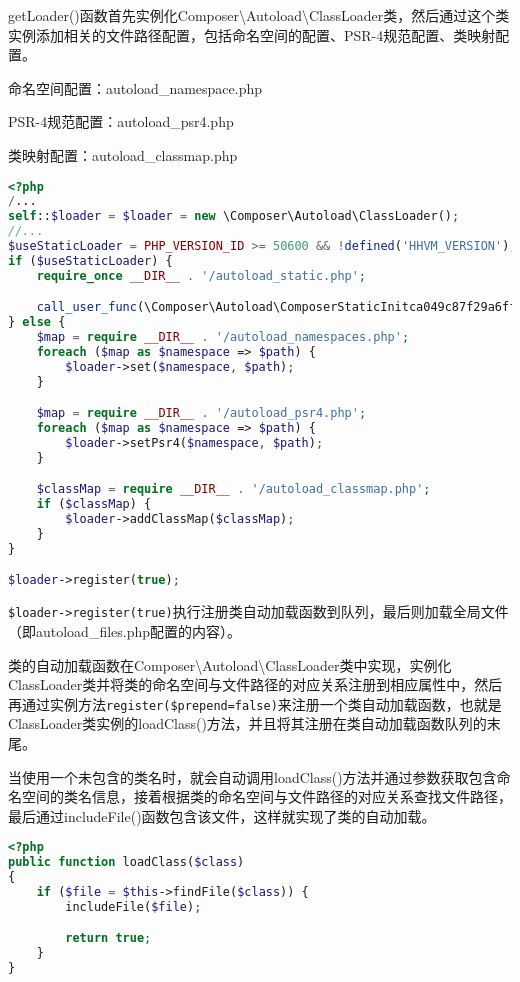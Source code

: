 getLoader()函数首先实例化Composer\textbackslash Autoload\textbackslash ClassLoader类，然后通过这个类实例添加相关的文件路径配置，包括命名空间的配置、PSR-4规范配置、类映射配置。

\begin{compactitem}
\item 命名空间配置：autoload\_namespace.php
\item PSR-4规范配置：autoload\_psr4.php
\item 类映射配置：autoload\_classmap.php
\end{compactitem}


\begin{lstlisting}[language=PHP]
<?php
/...
self::$loader = $loader = new \Composer\Autoload\ClassLoader();
//...
$useStaticLoader = PHP_VERSION_ID >= 50600 && !defined('HHVM_VERSION');
if ($useStaticLoader) {
    require_once __DIR__ . '/autoload_static.php';

    call_user_func(\Composer\Autoload\ComposerStaticInitca049c87f29a6ff5956132f96c58718a::getInitializer($loader));
} else {
    $map = require __DIR__ . '/autoload_namespaces.php';
    foreach ($map as $namespace => $path) {
        $loader->set($namespace, $path);
    }

    $map = require __DIR__ . '/autoload_psr4.php';
    foreach ($map as $namespace => $path) {
        $loader->setPsr4($namespace, $path);
    }

    $classMap = require __DIR__ . '/autoload_classmap.php';
    if ($classMap) {
        $loader->addClassMap($classMap);
    }
}

$loader->register(true);
\end{lstlisting}

\texttt{\$loader->register(true)}执行注册类自动加载函数到队列，最后则加载全局文件（即autoload\_files.php配置的内容）。

类的自动加载函数在Composer\textbackslash Autoload\textbackslash ClassLoader类中实现，实例化ClassLoader类并将类的命名空间与文件路径的对应关系注册到相应属性中，然后再通过实例方法\texttt{register(\$prepend=false)}来注册一个类自动加载函数，也就是ClassLoader类实例的loadClass()方法，并且将其注册在类自动加载函数队列的末尾。

当使用一个未包含的类名时，就会自动调用loadClass()方法并通过参数获取包含命名空间的类名信息，接着根据类的命名空间与文件路径的对应关系查找文件路径，最后通过includeFile()函数包含该文件，这样就实现了类的自动加载。

\begin{lstlisting}[language=PHP]
<?php
public function loadClass($class)
{
    if ($file = $this->findFile($class)) {
        includeFile($file);

        return true;
    }
}

\end{lstlisting}


